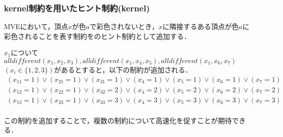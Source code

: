 \begin{frame}
    \frametitle{kernel制約を用いたヒント制約(kernel)}
    MVEにおいて，頂点$x$が色$a$で彩色されないとき，$x$に隣接するある頂点が色$a$に彩色されることを表す制約を{\alldifferent}のヒント制約として追加する．
    \begin{exampleblock}{}
        $x_1$について
        $alldifferent(x_1,x_2,x_3),alldifferent(x_1,x_4,x_5),alldifferent(x_1,x_6,x_7)$\\ $(x_i \in \{1,2,3\})$があるとすると，以下の制約が追加される．
        {\fontsize{10pt}{0pt}\selectfont
        \begin{eqnarray*}
            (x_11 = 1) \lor (x_21 = 1) \lor (x_31 = 1) \lor (x_4 = 1) \lor (x_5 = 1) \lor (x_6 = 1) \lor (x_7 = 1)\\
            (x_12 = 1) \lor (x_22 = 1) \lor (x_32 = 2) \lor (x_4 = 2) \lor (x_5 = 2) \lor (x_6 = 2) \lor (x_7 = 2)\\
            (x_13 = 1) \lor (x_23 = 1) \lor (x_33 = 3) \lor (x_4 = 3) \lor (x_5 = 3) \lor (x_6 = 3) \lor (x_7 = 3)\\
        \end{eqnarray*}
    }
    \end{exampleblock}
    この制約を追加することで，複数の{\alldifferent}制約について高速化を促すことが期待できる．
\end{frame}


